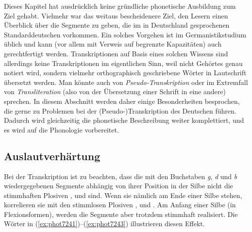 \label{sec:besonderheitendertranskription}

Dieses Kapitel hat ausdrücklich keine gründliche phonetische Ausbildung zum Ziel gehabt.
Vielmehr war das weitaus bescheidenere Ziel, den Lesern einen Überblick über die Segmente zu geben, die im in Deutschland gesprochenen Standarddeutschen vorkommen.
Ein solches Vorgehen ist im Germanistikstudium üblich und kann (vor allem mit Verweis auf begrenzte Kapazitäten) auch gerechtfertigt werden.
Transkriptionen auf Basis eines solchen Wissens sind allerdings keine Transkriptionen im eigentlichen Sinn, weil nicht Gehörtes genau notiert wird, sondern vielmehr orthographisch geschriebene Wörter in Lautschrift übersetzt werden.
Man könnte auch von \textit{Pseudo-Transkription} oder im Extremfall von \textit{Transliteration} (also von der Übersetzung einer Schrift in eine andere) sprechen.
In diesem Abschnitt werden daher einige Besonderheiten besprochen, die gerne zu Problemen bei der (Pseudo-)Transkription des Deutschen führen.
Dadurch wird gleichzeitig die phonetische Beschreibung weiter komplettiert, und es wird auf die Phonologie vorbereitet.

\subsection{Auslautverhärtung}

\label{sec:auslautverhaertungphonetik}


Bei der Transkription ist zu beachten, dass die mit den Buchstaben \textit{g}, \textit{d} und \textit{b} wiedergegebenen Segmente abhängig von ihrer Position in der Silbe nicht die stimmhaften Plosiven \textipa{[g]}, \textipa{[d]} und \textipa{[b]} sind.
Wenn sie nämlich am Ende einer Silbe stehen, korrelieren sie mit den stimmlosen Plosiven \textipa{[k]}, \textipa{[t]} und \textipa{[p]}.
Am Anfang einer Silbe (\zB in Flexionsformen), werden die Segmente aber trotzdem stimmhaft realisiert.
Die Wörter in (\ref{ex:phot7241})--(\ref{ex:phot7243}) illustrieren diesen Effekt.

\begin{exe}
  \ex\label{ex:phot7241}
  \begin{xlist}
  \end{xlist}
  \ex\label{ex:phot7242}
  \begin{xlist}
  \end{xlist}
  \ex\label{ex:phot7243}
  \begin{xlist}
  \end{xlist}
\end{exe}

